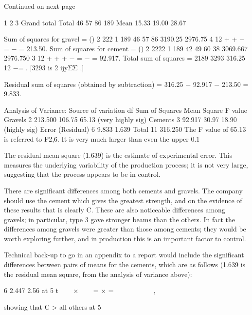 Continued on next page 
 
 1 2 3 Grand total Total 46 57 86 189 Mean 15.33 19.00 28.67  

 
 
Sum of squares for gravel = () 2 222 1 189 46 57 86 3190.25 2976.75 4 12 + + − = −  = 213.50. Sum of squares for cement = () 2 2222 1 189 42 49 60 38 3069.667 2976.750 3 12 + + + − = − = 92.917. Total sum of squares = 2189 3293 316.25 12 −= .        [3293 is 2 ijyΣΣ .] 
 
Residual sum of squares (obtained by subtraction) = 316.25 − 92.917 − 213.50 = 9.833. 
 
Analysis of Variance: 
 Source of variation df Sum of Squares Mean Square F value Gravels   2 213.500 106.75 65.13  (very highly sig) Cements   3   92.917   30.97 18.90   (highly sig) Error (Residual)   6     9.833       1.639  Total 11 316.250   
 The F value of 65.13 is referred to F2,6.  It is very much larger than even the upper 0.1%
 
The residual mean square (1.639) is the estimate of experimental error.  This measures the underlying variability of the production process;  it is not very large, suggesting that the process appears to be in control. 
 
There are significant differences among both cements and gravels.  The company should use the cement which gives the greatest strength, and on the evidence of these results that is clearly C.  These are also noticeable differences among gravels;  in particular, type 3 gave stronger beams than the others.  In fact the differences among gravels were greater than those among cements;  they would be worth exploring further, and in production this is an important factor to control. 
 
 
Technical back-up to go in an appendix to a report would include the significant differences between pairs of means for the cements, which are as follows (1.639 is the residual mean square, from the analysis of variance above): 
 
6
2.447 2.56 at 5%
t
   ×    = × =         
  , 
 
showing that C > all others at 5%